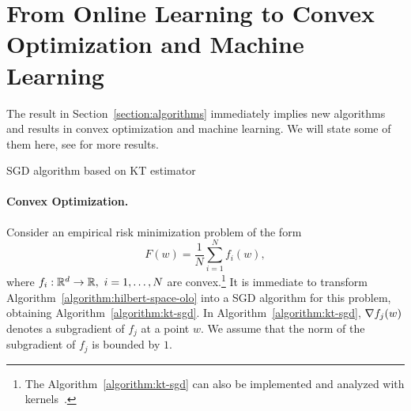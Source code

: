 \section{From Online Learning to Convex Optimization and Machine Learning}
\label{section:applications}

The result in Section~\ref{section:algorithms} immediately implies new
algorithms and results in convex optimization and machine learning. We will
state some of them here, see \cite{Orabona-2014} for more results.

\begin{algorithm}[t]
\caption{SGD algorithm based on KT estimator \label{algorithm:kt-sgd}}
\begin{algorithmic}[1]
{
\ENDFOR
{}
}
\end{algorithmic}
\end{algorithm}

\paragraph{Convex Optimization.}
Consider an empirical risk minimization problem of the form
%
\begin{equation}
\label{equation:objective-function}
F(w) = \frac{1}{N} \sum_{i=1}^N f_i(w),
\end{equation}
%
where $f_i:\mathbb{R}^d \to \mathbb{R}, \ i=1,\ldots,N$ are convex.\footnote{The
Algorithm~\ref{algorithm:kt-sgd} can also be implemented and analyzed with
kernels~\citep{Orabona-2014}.} It is immediate to transform
Algorithm~\ref{algorithm:hilbert-space-olo} into a \ac{SGD} algorithm for this
problem, obtaining Algorithm~\ref{algorithm:kt-sgd}. In
Algorithm~\ref{algorithm:kt-sgd}, $\nabla f_j(w)$ denotes a subgradient of $f_j$
at a point $w$.  We assume that the norm of the subgradient of $f_j$ is bounded
by $1$.

